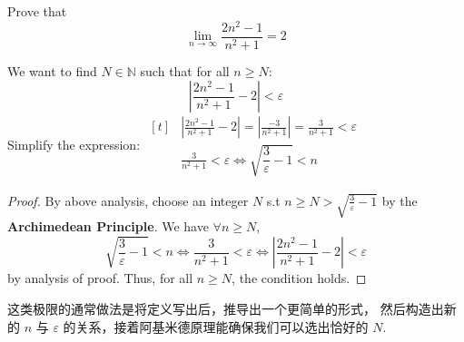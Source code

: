 \documentclass[
	UTF-8,
	11pt, %
	a4paper, %
]{LegrandOrangeBook}
\begin{document}
    \newpage

    \begin{example}
    Prove that $$\lim_{n \to \infty} \frac{2n^2 - 1}{n^2 + 1} = 2$$

    \begin{analysis}
        We want to find $N \in \mathbb{N}$ such that for all $n \ge N$:
        \[ \left| \frac{2n^2 - 1}{n^2 + 1} - 2 \right| < \varepsilon \]
        Simplify the expression:
        $
        \begin{aligned}[t]
            & \left| \frac{2n^2 - 1}{n^2 + 1} - 2 \right| = \left| \frac{-3}{n^2 + 1} \right| = \frac{3}{n^2 + 1} < \varepsilon\\
            &\frac{3}{n^2 + 1} < \varepsilon\iff  \sqrt{\dfrac{3}{\varepsilon}-1} < n
        \end{aligned} $

    \end{analysis}

    \begin{proof}
    By above analysis, choose an integer $N$ s.t $n\geq N > \sqrt{\frac{3}{\varepsilon}-1}$ by the \textbf{Archimedean Principle}.
    We have $\forall n \geq N$,
    $$
    \sqrt{\dfrac{3}{\varepsilon}-1} < n \iff \frac{3}{n^2 + 1} < \varepsilon \iff \left| \frac{2n^2 - 1}{n^2 + 1} - 2 \right| < \varepsilon
    $$
    by analysis of proof. Thus, for all $n \ge N$, the condition holds.
    \end{proof}
    \end{example}

    \begin{remark}
        这类极限的通常做法是将定义写出后，推导出一个更简单的形式，
        然后构造出新的 $n$ 与 $\varepsilon$ 的关系，接着阿基米德原理能确保我们可以选出恰好的 $N$.
    \end{remark}
\end{document}
